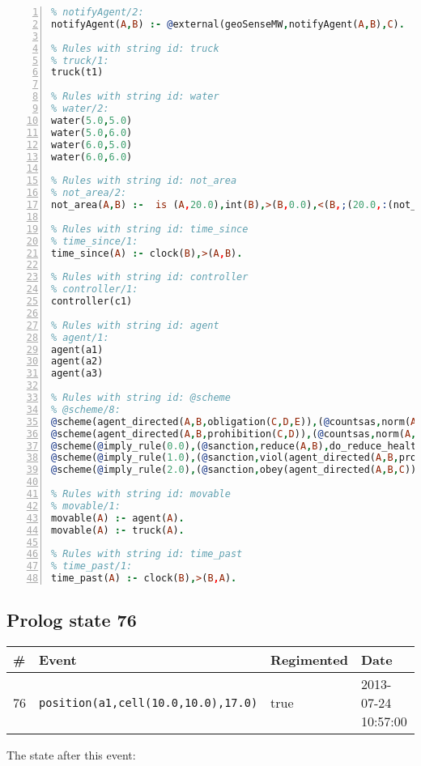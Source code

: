 \documentclass[11pt]{article}\usepackage[utf8]{inputenc}\usepackage{geometry}
\begin{document}
\begin{lstlisting}[language=Prolog, numbers=left]
% Rules with string id: notifyAgent
% notifyAgent/2:
notifyAgent(A,B) :- @external(geoSenseMW,notifyAgent(A,B),C).

% Rules with string id: truck
% truck/1:
truck(t1)

% Rules with string id: water
% water/2:
water(5.0,5.0)
water(5.0,6.0)
water(6.0,5.0)
water(6.0,6.0)

% Rules with string id: not_area
% not_area/2:
not_area(A,B) :-  is (A,20.0),int(B),>(B,0.0),<(B,;(20.0,:(not_area(A,B), is (-(B),20.0)))),int(A),>(A,0.0),<(A,;(20.0,:(area(A,B),-(int(A))))),int(B),>(A,0.0),>(B,0.0),<(A,21.0),<(B,21.0).

% Rules with string id: time_since
% time_since/1:
time_since(A) :- clock(B),>(A,B).

% Rules with string id: controller
% controller/1:
controller(c1)

% Rules with string id: agent
% agent/1:
agent(a1)
agent(a2)
agent(a3)

% Rules with string id: @scheme
% @scheme/8:
@scheme(agent_directed(A,B,obligation(C,D,E)),(@countsas,norm(A,B,F,obligation(C,D,E)),F),false,(listTrue(C)),(time_past(D)),false,[plus(viol(agent_directed(A,B,obligation(C,D,E))))|[]],[plus(obey(agent_directed(A,B,obligation(C,D,E))))|[]])
@scheme(agent_directed(A,B,prohibition(C,D)),(@countsas,norm(A,B,E,prohibition(C,D)),E),(listTrue(C)),false,(false),false,[plus(viol(agent_directed(A,B,prohibition(C,D))))|[]],[plus(obey(agent_directed(A,B,prohibition(C,D))))|[]])
@scheme(@imply_rule(0.0),(@sanction,reduce(A,B),do_reduce_health(A,B),notifyAgent(A,changed(status))),true,false,false,false,[min(reduce(A,B))|[]],[])
@scheme(@imply_rule(1.0),(@sanction,viol(agent_directed(A,B,prohibition(C,D))),do_sanction(D)),true,false,false,false,[min(viol(agent_directed(A,B,prohibition(C,D))))|[]],[])
@scheme(@imply_rule(2.0),(@sanction,obey(agent_directed(A,B,C))),true,false,false,false,[min(obey(agent_directed(A,B,C)))|[]],[])

% Rules with string id: movable
% movable/1:
movable(A) :- agent(A).
movable(A) :- truck(A).

% Rules with string id: time_past
% time_past/1:
time_past(A) :- clock(B),>(B,A).

\end{lstlisting}
\clearpage 
\subsection{Prolog state 76}
\begin{table}[ht]
\centering 
\begin{tabular}{l l l l} 
\textbf{\#} & \textbf{Event} & \textbf{Regimented} & \textbf{Date} \\ [0.5ex] 
\hline
76&\texttt{position(a1,cell(10.0,10.0),17.0)}&true&2013-07-24 10:57:00\\ [1ex] \hline\end{tabular}
\end{table}
The state after this event:
\end{document}
